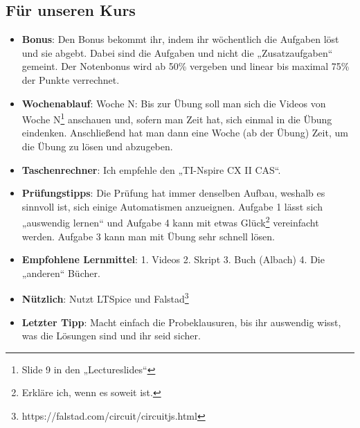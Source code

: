 \documentclass[11pt,a4paper]{article}
\begin{document}
\subsection{Für unseren Kurs}


\begin{itemize}
    \item \textbf{Bonus}: Den Bonus bekommt ihr, indem ihr wöchentlich die Aufgaben löst und sie abgebt. Dabei sind die Aufgaben und nicht die „Zusatzaufgaben“ gemeint. Der Notenbonus wird ab 50\% vergeben und linear bis maximal 75\% der Punkte verrechnet.
    \item \textbf{Wochenablauf}: Woche N: Bis zur Übung soll man sich die Videos von Woche N\footnote{Slide 9 in den „Lectureslides“} anschauen und, sofern man Zeit hat, sich einmal in die Übung eindenken. Anschließend hat man dann eine Woche (ab der Übung) Zeit, um die Übung zu lösen und abzugeben.
    \item \textbf{Taschenrechner}: Ich empfehle den „TI-Nspire CX II CAS“.
    \item \textbf{Prüfungstipps}: Die Prüfung hat immer denselben Aufbau, weshalb es sinnvoll ist, sich einige Automatismen anzueignen. Aufgabe 1 lässt sich „auswendig lernen“ und Aufgabe 4 kann mit etwas Glück\footnote{Erkläre ich, wenn es soweit ist.} vereinfacht werden. Aufgabe 3 kann man mit Übung sehr schnell lösen.
    \item \textbf{Empfohlene Lernmittel}: 1. Videos 2. Skript 3. Buch (Albach) 4. Die „anderen“ Bücher.
    \item \textbf{Nützlich}: Nutzt LTSpice und Falstad\footnote{https://falstad.com/circuit/circuitjs.html}
    \item \textbf{Letzter Tipp}: Macht einfach die Probeklausuren, bis ihr auswendig wisst, was die Lösungen sind und ihr seid sicher. 
\end{itemize}
\end{document}
